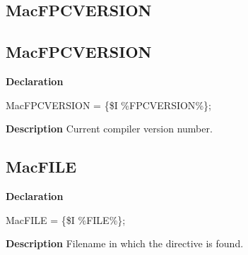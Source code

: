 \documentclass{report}
\newif\ifpdf
\begin{document}
\subsection*{\large{\textbf{MacFPCVERSION}}\normalsize\hspace{1ex}\hrulefill}
\else
\subsection*{MacFPCVERSION}
\fi
\label{ok_include_environment-MacFPCVERSION}
\begin{list}{}{
\setlength{\itemindent}{0cm}
\setlength{\listparindent}{0cm}
\setlength{\leftmargin}{\evensidemargin}
\addtolength{\leftmargin}{\tmplength}
\settowidth{\labelsep}{X}
\addtolength{\leftmargin}{\labelsep}
\setlength{\labelwidth}{\tmplength}
}
\item[\textbf{Declaration}\hfill]
\ifpdf
\begin{flushleft}
\fi
\begin{ttfamily}
MacFPCVERSION = {\{}{\$}I {\%}FPCVERSION{\%}{\}};\end{ttfamily}

\ifpdf
\end{flushleft}
\fi

\par
\item[\textbf{Description}]
Current compiler version number.

\end{list}
\ifpdf
\subsection*{\large{\textbf{MacFILE}}\normalsize\hspace{1ex}\hrulefill}
\else
\subsection*{MacFILE}
\fi
\label{ok_include_environment-MacFILE}
\begin{list}{}{
\setlength{\itemindent}{0cm}
\setlength{\listparindent}{0cm}
\setlength{\leftmargin}{\evensidemargin}
\addtolength{\leftmargin}{\tmplength}
\settowidth{\labelsep}{X}
\addtolength{\leftmargin}{\labelsep}
\setlength{\labelwidth}{\tmplength}
}
\item[\textbf{Declaration}\hfill]
\ifpdf
\begin{flushleft}
\fi
\begin{ttfamily}
MacFILE = {\{}{\$}I {\%}FILE{\%}{\}};\end{ttfamily}

\ifpdf
\end{flushleft}
\fi

\par
\item[\textbf{Description}]
Filename in which the directive is found.

\end{list}
\ifpdf
\end{document}

